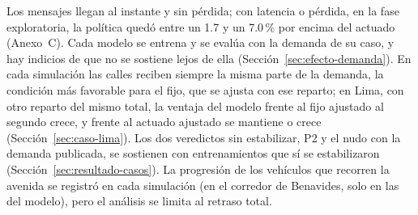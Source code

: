 Los mensajes llegan al instante y sin pérdida; con latencia o pérdida,
en la fase exploratoria, la política quedó entre un 1.7 y un 7.0\,\% por
encima del actuado (Anexo~C). Cada modelo se entrena y se evalúa con la
demanda de su caso, y hay indicios de que no se sostiene lejos de ella
(Sección~\ref{sec:efecto-demanda}). En cada simulación las calles
reciben siempre la misma parte de la demanda, la condición más favorable
para el fijo, que se ajusta con ese reparto; en Lima, con otro reparto
del mismo total, la ventaja del modelo frente al fijo ajustado al
segundo crece, y frente al actuado ajustado se mantiene o crece
(Sección~\ref{sec:caso-lima}). Los dos veredictos sin estabilizar, P2 y
el nudo con la demanda publicada, se sostienen con entrenamientos que sí
se estabilizaron (Sección~\ref{sec:resultado-casos}). La progresión de los vehículos que
recorren la avenida se registró en cada simulación (en el corredor de
Benavides, solo en las del modelo), pero el análisis se limita al
retraso total.

